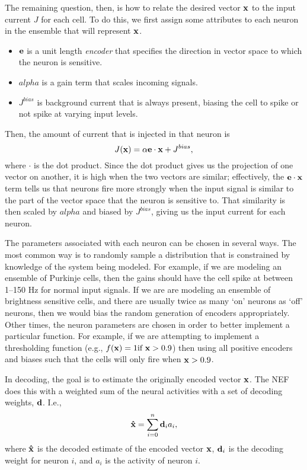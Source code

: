{The remaining question, then,
is how to relate the desired vector
$\mathbf{x}$ to the input current
$J$ for each cell.
To do this, we first assign some
attributes to each neuron in the ensemble
that will represent $\mathbf{x}$.
\begin{itemize}
  \item $\mathbf{e}$ is a unit length \textit{encoder}
    that specifies the direction in vector space
    to which the neuron is sensitive.
  \item $alpha$ is a gain term that scales
    incoming signals.
  \item $J^{bias}$ is background current that
    is always present, biasing the cell
    to spike or not spike at varying input levels.
\end{itemize}
Then, the amount of current that is injected
in that neuron is
\begin{equation} \label{eq:encoding}
  J(\mathbf{x}) = \alpha \mathbf{e} \cdot \mathbf{x} + J^{bias},
\end{equation}
where $\cdot$ is the dot product.
Since the dot product gives us
the projection of one vector on another,
it is high when the two vectors are similar;
effectively, the $\mathbf{e} \cdot \mathbf{x}$ term
tells us that neurons fire
more strongly when the input signal
is similar to the part of the vector space
that the neuron is sensitive to.
That similarity is then scaled by $alpha$
and biased by $J^{bias}$,
giving us the input current for each neuron.

The parameters associated with each neuron
can be chosen in several ways.
The most common way is to randomly sample
a distribution that is constrained
by knowledge of the system being modeled.
For example, if we are modeling an ensemble
of Purkinje cells, then the gains should
have the cell spike at between 1--150 Hz
for normal input signals.
If we are are modeling
an ensemble of brightness sensitive cells,
and there are usually
twice as many `on' neurons as `off' neurons,
then we would bias the
random generation of encoders appropriately.
Other times, the neuron parameters
are chosen in order to better implement
a particular function.
For example, if we are attempting to
implement a thresholding function
(e.g., $f(\mathbf{x}) = 1 \text{if } \mathbf{x} > 0.9$)
then using all positive encoders
and biases such that the cells
will only fire when $\mathbf{x} > 0.9$.

In decoding, the goal is to estimate
the originally encoded vector $\mathbf{x}$.
The NEF does this with a weighted sum
of the neural activities with a set
of decoding weights, $\mathbf{d}$.
I.e.,
\begin{equation}
  \label{vec}
  \mathbf{\hat{x}} = \sum_{i=0}^n \mathbf{d}_i a_i,
\end{equation}
where $\mathbf{\hat{x}}$ is the
decoded estimate of the encoded vector $\mathbf{x}$,
$\mathbf{d}_i$ is the decoding weight for neuron $i$,
and $a_i$ is the activity of neuron $i$.

}
